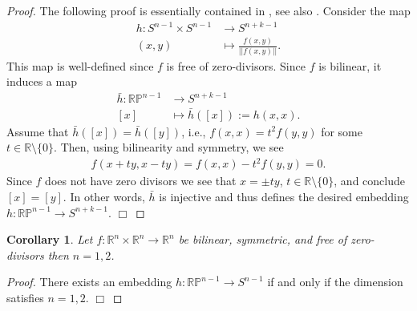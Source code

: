 \documentclass[12pt]{article}
\newtheorem{corollary}[lemma]{Corollary}
\newcommand{\proofend}{$\Box$\bigskip}
\newcommand{\R}{{\mathbb R}}
\newcommand{\RP}{{\mathbb {RP}}}
\begin{document}
\begin{proof}
The following proof is essentially contained in \cite{Hopf}, see also \cite{Ja}. Consider the map
\begin{equation}\nonumber
\begin{aligned}
h:S^{n-1}\times S^{n-1}&\to S^{n+k-1}\\
(x,y)&\mapsto \frac{f(x,y)}{||f(x,y)||}.
\end{aligned}
\end{equation}
This map is well-defined since $f$ is free of zero-divisors. Since $f$ is bilinear, it induces a map
\begin{equation}\nonumber
\begin{aligned}
\bar h:\RP^{n-1}&\to S^{n+k-1}\\
[x]&\mapsto \bar h([x]):=h(x,x).
\end{aligned}
\end{equation}
Assume that $\bar h([x])=\bar h([y])$, i.e., $f(x,x)=t^2f(y,y)$ for some $t\in\R\setminus\{0\}$. Then, using bilinearity and symmetry, we see
\begin{equation}\nonumber
\begin{aligned}
f(x+ty,x-ty)=f(x,x)-t^2f(y,y)=0.
\end{aligned}
\end{equation}
Since $f$ does not have zero divisors we see that $x=\pm ty$, $t\in\R\setminus\{0\}$, and conclude $[x]=[y]$. In other words, $\bar h$ is injective and thus defines the desired embedding $h:\RP^{n-1}\to S^{n+k-1}$. \proofend
\end{proof}

\begin{corollary}
Let $f:\R^n\times\R^n\to\R^{n}$ be bilinear, symmetric, and free of zero-divisors then $n=1,2$.
\end{corollary}

\begin{proof}
There exists an embedding $h:\RP^{n-1}\to S^{n-1}$ if and only if the dimension satisfies $n=1,2$. \proofend
\end{proof}
\end{document}
